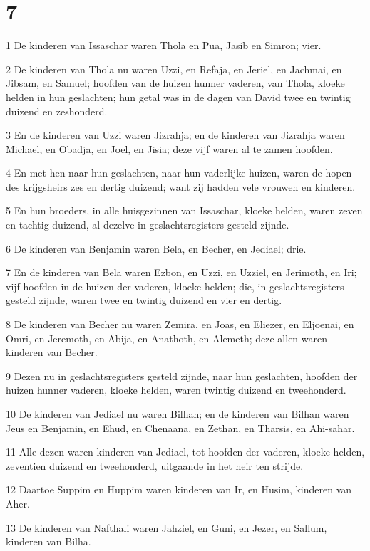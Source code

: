 \chapter{7}

\par 1 De kinderen van Issaschar waren Thola en Pua, Jasib en Simron; vier.
\par 2 De kinderen van Thola nu waren Uzzi, en Refaja, en Jeriel, en Jachmai, en Jibsam, en Samuel; hoofden van de huizen hunner vaderen, van Thola, kloeke helden in hun geslachten; hun getal was in de dagen van David twee en twintig duizend en zeshonderd.
\par 3 En de kinderen van Uzzi waren Jizrahja; en de kinderen van Jizrahja waren Michael, en Obadja, en Joel, en Jisia; deze vijf waren al te zamen hoofden.
\par 4 En met hen naar hun geslachten, naar hun vaderlijke huizen, waren de hopen des krijgsheirs zes en dertig duizend; want zij hadden vele vrouwen en kinderen.
\par 5 En hun broeders, in alle huisgezinnen van Issaschar, kloeke helden, waren zeven en tachtig duizend, al dezelve in geslachtsregisters gesteld zijnde.
\par 6 De kinderen van Benjamin waren Bela, en Becher, en Jediael; drie.
\par 7 En de kinderen van Bela waren Ezbon, en Uzzi, en Uzziel, en Jerimoth, en Iri; vijf hoofden in de huizen der vaderen, kloeke helden; die, in geslachtsregisters gesteld zijnde, waren twee en twintig duizend en vier en dertig.
\par 8 De kinderen van Becher nu waren Zemira, en Joas, en Eliezer, en Eljoenai, en Omri, en Jeremoth, en Abija, en Anathoth, en Alemeth; deze allen waren kinderen van Becher.
\par 9 Dezen nu in geslachtsregisters gesteld zijnde, naar hun geslachten, hoofden der huizen hunner vaderen, kloeke helden, waren twintig duizend en tweehonderd.
\par 10 De kinderen van Jediael nu waren Bilhan; en de kinderen van Bilhan waren Jeus en Benjamin, en Ehud, en Chenaana, en Zethan, en Tharsis, en Ahi-sahar.
\par 11 Alle dezen waren kinderen van Jediael, tot hoofden der vaderen, kloeke helden, zeventien duizend en tweehonderd, uitgaande in het heir ten strijde.
\par 12 Daartoe Suppim en Huppim waren kinderen van Ir, en Husim, kinderen van Aher.
\par 13 De kinderen van Nafthali waren Jahziel, en Guni, en Jezer, en Sallum, kinderen van Bilha.
